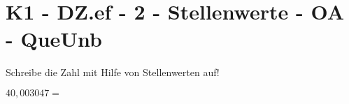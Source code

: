\section{K1 - DZ.ef - 2 - Stellenwerte - OA - QueUnb}

\begin{beispiel}{0} %
				Schreibe die Zahl mit Hilfe von Stellenwerten auf!\leer
					
					$40,003047=$ 
\end{beispiel}